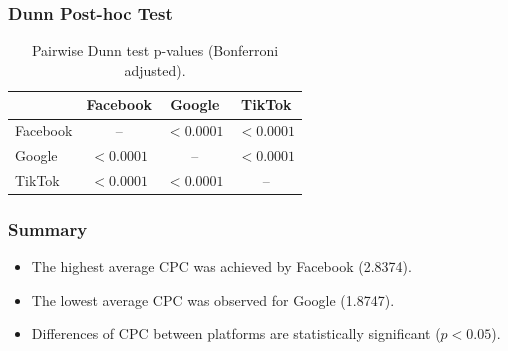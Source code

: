 \subsubsection{Dunn Post-hoc Test}

\begin{table}[H]
	\centering
	\caption{Pairwise Dunn test p-values (Bonferroni adjusted).}
	\begin{tabular}{lccc}
		\toprule
		& Facebook & Google & TikTok \\
		\midrule
		Facebook & -- & $<0.0001$ & $<0.0001$ \\
		Google & $<0.0001$ & -- & $<0.0001$ \\
		TikTok & $<0.0001$ & $<0.0001$ & -- \\
		\bottomrule
	\end{tabular}
\end{table}

\subsubsection{Summary}

\begin{itemize}
	\item The highest average CPC was achieved by Facebook (2.8374).
	\item The lowest average CPC was observed for Google (1.8747).
	\item Differences of CPC between platforms are statistically significant ($p<0.05$).
\end{itemize}


